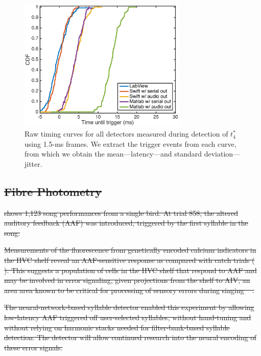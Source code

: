 \documentclass[10pt,letterpaper]{article}
\newcommand\fig[1]{Fig.~\ref{#1}}
\providecommand{\DIFdeltex}[1]{{\protect\color{red}\sout{#1}}}                      %
\providecommand{\DIFdelbegin}{} %
\providecommand{\DIFdel}[1]{\texorpdfstring{\DIFdeltex{#1}}{}} %
\begin{document}
\begin{figure}
  \begin{center}
    \includegraphics[width=8cm]{Fig7}
  \end{center}
  \caption{Raw timing curves for all detectors measured during
    detection of $t^*_4$ using 1.5-ms frames.  We extract the trigger events from each curve, from which we obtain the mean---latency---and
    standard deviation---jitter.}
  \label{fig:timing}
\end{figure}


\DIFdelbegin \subsection{\DIFdel{Fibre Photometry}}
\addtocounter{subsection}{-1}%

\DIFdel{shows 1,123 song performances from a single bird. 
At trial 858, the altered auditory feedback (AAF) was introduced, 
triggered by the first syllable in the song.
}%

\DIFdel{Measurements of the fluorescence from genetically encoded calcium indicators
in the HVC shelf reveal an AAF-sensitive response as compared with catch trials
(}%
\DIFdel{). This suggests a population of cells in the HVC
shelf that respond to AAF and may be involved in error signaling, given projections
from the shelf to AIV, an area area known to be critical for processing of 
sensory errors during singing \mbox{%
\cite{MandelblatCerf:2014eu}}%
.
}%

\DIFdel{The neural-network-based syllable detector enabled this experiment
by allowing low-latency AAF triggered off user-selected syllables, 
without hand-tuning and without relying on harmonic stacks needed 
for filter-bank-based syllable detection. The detector will allow
continued research into the neural encoding of these error signals.
}%
\end{document}
